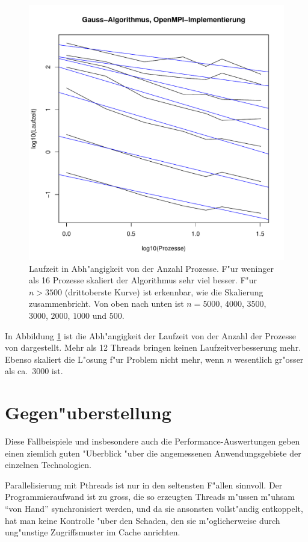 \begin{figure}
\begin{center}
\includegraphics[width=\hsize]{images/gauss-threads.pdf}
\end{center}
\caption{Laufzeit in Abh"angigkeit von der Anzahl Prozesse.
F"ur weninger als 16 Prozesse skaliert der Algorithmus sehr viel besser.
F"ur $n>3500$ (drittoberste Kurve) ist erkennbar, wie die Skalierung
zusammenbricht. 
Von oben nach unten ist $n=5000$, $4000$, $3500$, $3000$, $2000$, $1000$
und $500$.
\label{openmpi-threads}}
\end{figure}
In Abbildung \ref{openmpi-threads} ist die Abh"angigkeit der Laufzeit von
der Anzahl der Prozesse von dargestellt. Mehr als 12 Threads bringen
keinen Laufzeitverbesserung mehr. Ebenso skaliert die L"osung f"ur 
Problem nicht mehr, wenn $n$ wesentlich gr"osser als ca.~3000 ist.

\section{Gegen"uberstellung}
Diese Fallbeispiele und insbesondere auch die Performance-Auswertungen
geben einen ziemlich guten "Uberblick "uber die angemessenen Anwendungsgebiete
der einzelnen Technologien.

Parallelisierung mit Pthreads ist nur in den seltensten F"allen sinnvoll.
Der Programmieraufwand ist zu gross, die so erzeugten Threads m"ussen
m"uhsam ``von Hand'' synchronisiert werden, und da sie ansonsten
vollst"andig entkoppelt, hat man keine Kontrolle "uber den Schaden,
den sie m"oglicherweise durch ung"unstige Zugriffsmuster im Cache anrichten.

